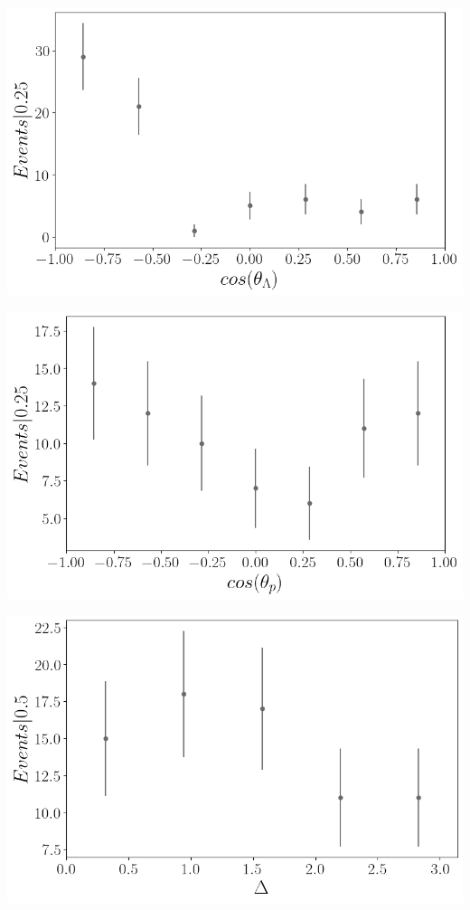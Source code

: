 \documentclass[a0,portrait]{a0poster}
\begin{document}
\begin{mdframed}[style=MyFrame]
\begin{multicols}{2}
{    \begin{minipage}[b]{0.5\columnwidth}
        \centering
        \includegraphics[width=1\columnwidth]{img/cos_theta_lambda.png}
    \end{minipage}
    \begin{minipage}[b]{0.5\columnwidth}
        \centering
        \includegraphics[width=1\columnwidth]{img/cos_theta_p.png}
    \end{minipage}
    
}

\begin{minipage}[b]{1\columnwidth}
    \centering
    \includegraphics[width=0.5\columnwidth]{img/Delta.png}
\end{minipage}



\end{multicols}
\end{mdframed}
\end{document}
